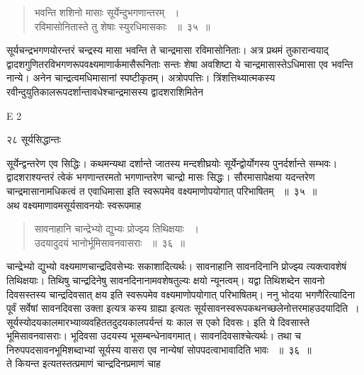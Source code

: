 \documentclass[11pt, openany]{book}
\begin{document}
 
 \begin{quote}
 {\ssi भवन्ति शशिनो मासाः सूर्येन्दुभगणान्तरम् ~।\\
रविमासोनितास्ते तु शेषाः स्युरधिमासकाः ~॥~३५~॥}
\end{quote}
\begin{sloppypar}
सूर्यचन्द्रभगणयोरन्तरं चन्द्रस्य मासा भवन्ति ते चान्द्रमासा रविमासोनिताः। अत्र प्रथमं तुकारान्वयाद् द्वादशगुणितरविभगणरूपवक्ष्यमाणार्कमासैरूनिताः सन्तः शेषा अवशिष्टा ये चान्द्रमासास्तेऽधिमासा एव भवन्ति नान्ये। अनेन चान्द्रत्वमधिमासानां स्पष्टीकृतम्। अत्रोपपत्तिः। त्रिंशत्तिथ्यात्मकस्य रवीन्दुयुतिकालरूपदर्शान्तावधेश्चान्द्रमासस्य द्वादशराशिमितेन
\end{sloppypar}

{\tiny{E 2}}


\newpage

\noindent २८ \hspace{4cm} सूर्यसिद्धान्तः 
\vspace{1cm}
 
\begin{sloppypar}
\noindent सूर्येन्द्वन्तरेण एव सिद्धिः। कथमन्यथा दर्शान्ते जातस्य मन्दशीघ्रयोः सूर्येन्द्वोर्योगस्य पुनर्दर्शान्ते सम्भवः। द्वादशराश्यन्तरं त्वेकं भगणान्तरमतो भगणान्तरेण चान्द्रो मासः सिद्धः। सौरमासापेक्षया यदन्तरेण चान्द्रमासानामधिकत्वं त एवाधिमासा इति स्वरूपमेव वक्ष्यमाणोपयोगात् परिभाषितम् ~॥~३५~॥\\ 
\noindent अथ वक्ष्यमाणावमसूर्यसावनयोः स्वरूपमाह\textendash
\end{sloppypar}
\begin{quote}
 
 {\ssi सावनाहानि चान्द्रेभ्यो द्युभ्यः प्रोज्झ्य तिथिक्षयाः ~।\\  
उदयादुदयं भानोर्भूमिसावनवासराः ~॥~३६~॥}
\end{quote}
\begin{sloppypar}
चान्द्रेभ्यो द्युभ्यो वक्ष्यमाणचान्द्रदिवसेभ्यः सकाशादित्यर्थः। सावनाहानि सावनदिनानि प्रोज्झ्य त्यक्त्वावशेषं तिथिक्षयाः। तिथिषु चान्द्रदिनेषु सावनदिनानामवशेषतुल्यः क्षयो न्यूनत्वम्। यद्वा तिथिशब्देन सावनो दिवसस्तस्य चान्द्रदिवसात् क्षय इति स्वरूपमेव वक्ष्यमाणोपयोगात् परिभाषितम्। ननु भोदया भगणैरित्यादिना पूर्वं सर्वेषां सावनदिवसा उक्ता इत्यत्र कस्य ग्राह्या इत्यतः सूर्यसावनस्वरूपकथनच्छलेनोत्तरमाह\textendash उदयादिति~। सूर्यस्योदयकालमारभ्याव्यवहिततदुदयकालपर्यन्तं यः काल स एको दिवसः। इति ये दिवसास्ते भूमिसावनवासराः। भूदिवसा उदयस्य भूसम्बन्धेनावगमात्। सावनदिवसाश्चेत्यर्थः। तथा च निरुपपदसावनभूमिशब्दाभ्यां सूर्यस्य वासरा एव नान्येषां सोपपदत्वाभावादिति भावः ~॥~३६~॥\\ 
\noindent ते कियन्त इत्यतस्तत्प्रमाणं चान्द्रदिनप्रमाणं चाह\textendash
\end{sloppypar}
\end{document}
